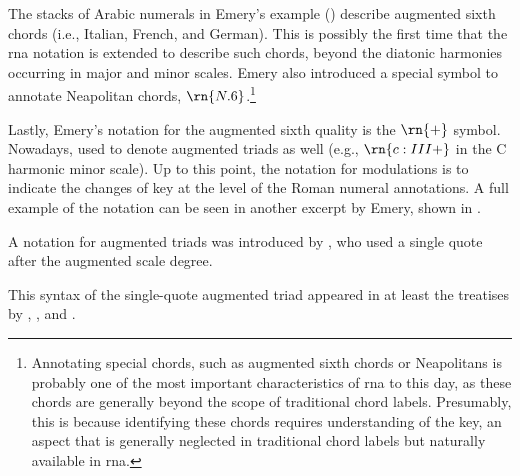 


The stacks of Arabic numerals in Emery's example
() describe
augmented sixth chords (i.e., Italian, French, and German).
This is possibly the first time that the \gls{rna} notation
is extended to describe such chords, beyond the diatonic
harmonies occurring in major and minor scales. Emery also
introduced a special symbol to annotate Neapolitan chords,
$\rn{N.6}$.\footnote{Annotating special chords, such as
augmented sixth chords or Neapolitans is probably one of the
most important characteristics of \gls{rna} to this day, as
these chords are generally beyond the scope of traditional
chord labels. Presumably, this is because identifying these
chords requires understanding of the key, an aspect that is
generally neglected in traditional chord labels but
naturally available in \gls{rna}.}

Lastly, Emery's notation for the augmented sixth quality is
the $\rn{+}$ symbol. Nowadays, used to denote augmented
triads as well (e.g., $\rn{c:III+}$ in the C harmonic minor
scale). Up to this point, the notation for modulations is to
indicate the changes of key at the level of the Roman
numeral annotations. A full example of the notation can be
seen in another excerpt by Emery, shown in
.


A notation for augmented triads was introduced by
\textcite{jadassohn1883lehrbuch}, who used a single quote
after the augmented scale degree.


This syntax of the single-quote augmented triad appeared in
at least the treatises by \textcite{broekhoven1889system},
\textcite{buwa1893schule}, and
\textcite{shepard1896harmony}.

